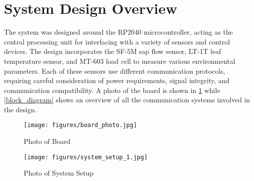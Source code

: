
\section{System Design Overview}

The system was designed around the RP2040 microcontroller, acting as the central 
processing unit for interfacing with a variety of sensors and control devices. 
The design incorporates the SF-5M sap flow sensor, LT-1T leaf temperature sensor, 
and MT-603 load cell to measure various environmental parameters. Each of these 
sensors use different communication protocols, requiring careful consideration of 
power requirements, signal integrity, and communication compatibility. A photo 
of the board is shown in \cref{board_photo} while \cref{block_diagram} 
shows an overview of all the communication systems involved in the design.

\begin{figure}
    \texttt{[image: figures/board\_photo.jpg]}
    \caption{Photo of Board}
    \label{board_photo}
\end{figure}

\begin{figure}
    \texttt{[image: figures/system\_setup\_1.jpg]}
    \caption{Photo of System Setup}
    \label{system_photo}
\end{figure}

